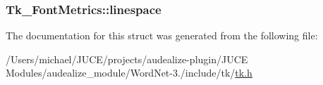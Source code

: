\subsubsection[{\texorpdfstring{linespace}{linespace}}]{ Tk\+\_\+\+Font\+Metrics\+::linespace}\hypertarget{struct_tk___font_metrics_ab5a9c7940e6681a59cbf0400b16b76a7}{}\label{struct_tk___font_metrics_ab5a9c7940e6681a59cbf0400b16b76a7}


The documentation for this struct was generated from the following file\+:\begin{DoxyCompactItemize}
\item 
/\+Users/michael/\+J\+U\+C\+E/projects/audealize-\/plugin/\+J\+U\+C\+E Modules/audealize\+\_\+module/\+Word\+Net-\/3./include/tk/\hyperlink{tk_8h}{tk.\+h}\end{DoxyCompactItemize}
